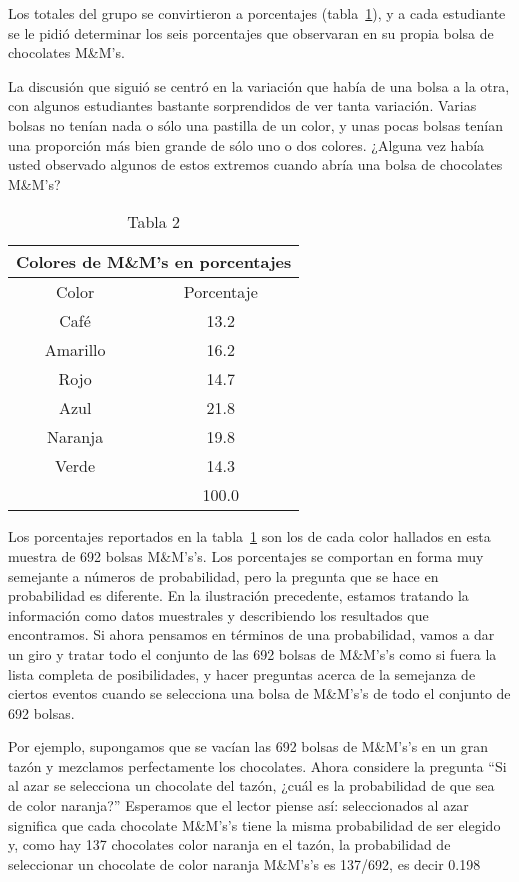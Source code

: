 \documentclass[10pt,twoside]{article}
\begin{document}
Los totales del grupo se convirtieron a porcentajes (tabla~\ref{tab2}), y a cada estudiante se le pidió determinar los seis porcentajes que observaran en su propia bolsa de chocolates M\&M's.

La discusión que siguió se centró en la variación que había de una bolsa a la
otra, con algunos estudiantes bastante sorprendidos de ver tanta variación. Varias
bolsas no tenían nada o sólo una pastilla de un color, y unas pocas bolsas tenían una
proporción más bien grande de sólo uno o dos colores. ¿Alguna vez había usted observado algunos de estos extremos cuando abría una bolsa de chocolates M\&M's?
\begin{table}[h!]
\centering
\begin{tabular}{cc}
\multicolumn{2}{c}{Colores de M\&M's en porcentajes} \\ 
\hline 
Color & Porcentaje \\ 
\hline 
Café & 13.2 \\ 
Amarillo & 16.2 \\ 
Rojo & 14.7 \\ 
Azul & 21.8 \\ 
Naranja & 19.8 \\ 
Verde & 14.3 \\ \cline{2-2} 
 & 100.0 \\ 
\hline 
\end{tabular} 
\caption{Tabla 2} \label{tab2}
\end{table}

Los porcentajes reportados en la tabla~\ref{tab2} son los de cada color hallados en esta
muestra de 692 bolsas M\&M's’s. Los porcentajes se comportan en forma muy semejante a números de probabilidad, pero la pregunta que se hace en probabilidad es diferente. En la ilustración precedente, estamos tratando la información como datos muestrales y describiendo los resultados que encontramos. Si ahora pensamos
en términos de una probabilidad, vamos a dar un giro y tratar todo el conjunto de
las 692 bolsas de M\&M's’s como si fuera la lista completa de posibilidades, y hacer
preguntas acerca de la semejanza de ciertos eventos cuando se selecciona una bolsa
de M\&M's’s de todo el conjunto de 692 bolsas.

Por ejemplo, supongamos que se vacían las 692 bolsas de M\&M's’s en un gran
tazón y mezclamos perfectamente los chocolates. Ahora considere la pregunta “Si
al azar se selecciona un chocolate del tazón, ¿cuál es la probabilidad de que sea de
color naranja?” Esperamos que el lector piense así: seleccionados al azar significa
que cada chocolate M\&M's’s tiene la misma probabilidad de ser elegido y, como hay
137 chocolates color naranja en el tazón, la probabilidad de seleccionar un chocolate de color naranja M\&M's’s es 137/692, es decir 0.198
\end{document}
